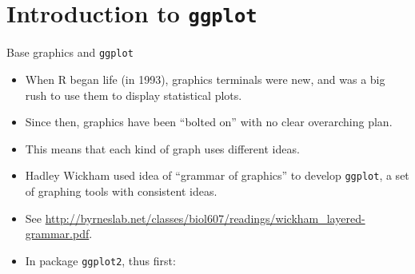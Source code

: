 \section{Introduction to \texttt{ggplot}}
\frame{\sectionpage}

\begin{frame}[fragile]{Base graphics and \texttt{ggplot}}
  
  \begin{itemize}
  \item When R began life (in 1993), graphics terminals were new, and
    was a big rush to use them to display statistical plots.
  \item Since then, graphics have been ``bolted on'' with no clear
    overarching plan.
  \item This means that each kind of graph uses different ideas.
  \item Hadley Wickham used idea of ``grammar of graphics'' to develop
    \texttt{ggplot}, a set of graphing tools with consistent ideas.
  \item See
    \url{http://byrneslab.net/classes/biol607/readings/wickham_layered-grammar.pdf}.
  \item In package \texttt{ggplot2}, thus first:
\begin{knitrout}
\color{fgcolor}\begin{kframe}
\begin{alltt}
\end{alltt}


{\ttfamily\noindent\itshape\color{messagecolor}{\#\# Loading tidyverse: ggplot2\\\#\# Loading tidyverse: tibble\\\#\# Loading tidyverse: tidyr\\\#\# Loading tidyverse: readr\\\#\# Loading tidyverse: purrr\\\#\# Loading tidyverse: dplyr}}

{\ttfamily\noindent\itshape\color{messagecolor}{\#\# Conflicts with tidy packages ----------------------------------------------}}

{\ttfamily\noindent\itshape\color{messagecolor}{\#\# filter(): dplyr, stats\\\#\# lag():\ \ \ \ dplyr, stats}}\end{kframe}
\end{knitrout}
  \end{itemize}
  
\end{frame}

